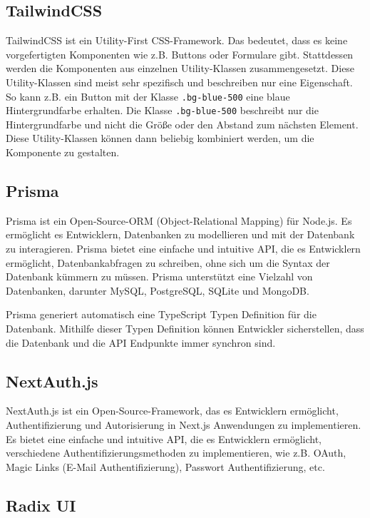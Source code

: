 \subsection{TailwindCSS}

TailwindCSS ist ein Utility-First CSS-Framework. Das bedeutet, dass es keine vorgefertigten Komponenten wie z.B. Buttons oder Formulare gibt. Stattdessen werden die Komponenten aus einzelnen Utility-Klassen zusammengesetzt. Diese Utility-Klassen sind meist sehr spezifisch und beschreiben nur eine Eigenschaft. So kann z.B. ein Button mit der Klasse \texttt{.bg-blue-500} eine blaue Hintergrundfarbe erhalten. Die Klasse \texttt{.bg-blue-500} beschreibt nur die Hintergrundfarbe und nicht die Größe oder den Abstand zum nächsten Element. Diese Utility-Klassen können dann beliebig kombiniert werden, um die Komponente zu gestalten.

\subsection{Prisma}

Prisma ist ein Open-Source-ORM (Object-Relational Mapping) für Node.js. Es ermöglicht es Entwicklern, Datenbanken zu modellieren und mit der Datenbank zu interagieren. Prisma bietet eine einfache und intuitive API, die es Entwicklern ermöglicht, Datenbankabfragen zu schreiben, ohne sich um die Syntax der Datenbank kümmern zu müssen. Prisma unterstützt eine Vielzahl von Datenbanken, darunter MySQL, PostgreSQL, SQLite und MongoDB.

Prisma generiert automatisch eine TypeScript Typen Definition für die Datenbank. Mithilfe dieser Typen Definition können Entwickler sicherstellen, dass die Datenbank und die API Endpunkte immer synchron sind.

\subsection{NextAuth.js}

NextAuth.js ist ein Open-Source-Framework, das es Entwicklern ermöglicht, Authentifizierung und Autorisierung in Next.js Anwendungen zu implementieren. Es bietet eine einfache und intuitive API, die es Entwicklern ermöglicht, verschiedene Authentifizierungsmethoden zu implementieren, wie z.B. OAuth, Magic Links (E-Mail Authentifizierung), Passwort Authentifizierung, etc.

\subsection{Radix UI}

